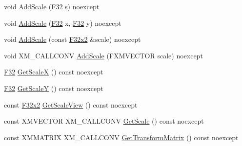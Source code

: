 \begin{DoxyCompactItemize}
\item 
void \mbox{\hyperlink{classmage_1_1_texture_transform2_d_aa66a44244931c2c6405c08de8761eccf}{Add\+Scale}} (\mbox{\hyperlink{namespacemage_aa97e833b45f06d60a0a9c4fc22ae02c0}{F32}} s) noexcept
\item 
void \mbox{\hyperlink{classmage_1_1_texture_transform2_d_a2cfeed9767368dc1798d64380a2a54d0}{Add\+Scale}} (\mbox{\hyperlink{namespacemage_aa97e833b45f06d60a0a9c4fc22ae02c0}{F32}} x, \mbox{\hyperlink{namespacemage_aa97e833b45f06d60a0a9c4fc22ae02c0}{F32}} y) noexcept
\item 
void \mbox{\hyperlink{classmage_1_1_texture_transform2_d_a120c706c5a1c415882d624f8c2cdd911}{Add\+Scale}} (const \mbox{\hyperlink{namespacemage_aee4759dedc8def6c6dec26b5c7eddf29}{F32x2}} \&scale) noexcept
\item 
void X\+M\+\_\+\+C\+A\+L\+L\+C\+O\+NV \mbox{\hyperlink{classmage_1_1_texture_transform2_d_a4d6ec837e693847b7c6ec73905a05da8}{Add\+Scale}} (F\+X\+M\+V\+E\+C\+T\+OR scale) noexcept
\item 
\mbox{\hyperlink{namespacemage_aa97e833b45f06d60a0a9c4fc22ae02c0}{F32}} \mbox{\hyperlink{classmage_1_1_texture_transform2_d_a4fdfdbf70fbd437598b21c73f24a9ce4}{Get\+ScaleX}} () const noexcept
\item 
\mbox{\hyperlink{namespacemage_aa97e833b45f06d60a0a9c4fc22ae02c0}{F32}} \mbox{\hyperlink{classmage_1_1_texture_transform2_d_aba1fc21e0b534a02fbad5ae1ee600d78}{Get\+ScaleY}} () const noexcept
\item 
const \mbox{\hyperlink{namespacemage_aee4759dedc8def6c6dec26b5c7eddf29}{F32x2}} \mbox{\hyperlink{classmage_1_1_texture_transform2_d_a127faf8911063c5afc92daf39e97a332}{Get\+Scale\+View}} () const noexcept
\item 
const X\+M\+V\+E\+C\+T\+OR X\+M\+\_\+\+C\+A\+L\+L\+C\+O\+NV \mbox{\hyperlink{classmage_1_1_texture_transform2_d_a012b9ef8da2821618b3eeb91e9888940}{Get\+Scale}} () const noexcept
\item 
const X\+M\+M\+A\+T\+R\+IX X\+M\+\_\+\+C\+A\+L\+L\+C\+O\+NV \mbox{\hyperlink{classmage_1_1_texture_transform2_d_ad872a2e22b213ac60df6a6d9548d6457}{Get\+Transform\+Matrix}} () const noexcept
\end{DoxyCompactItemize}
